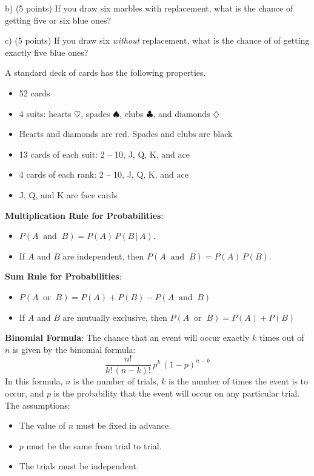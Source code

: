 \documentclass[10pt]{article}
\begin{document}
\hspace{10pt} b) (5 points) If you draw six marbles with replacement, what is the chance of getting 
 five or six blue ones?
\vspace{2.3in}

\hspace{10pt} c) (5 points) If you draw six  \textit{without} replacement, what is the chance of 
of getting  exactly five blue ones?

\vfill
\eject
 A standard deck of cards has the following properties.
\begin{itemize}
\item 52 cards
\item 4 suits:  hearts $\heartsuit$, spades $\spadesuit$, clubs $\clubsuit$,
  and diamonds $\diamondsuit$
\item Hearts and diamonds are red.  Spades and clubs are black
\item 13 cards of each suit:  2 -- 10, J, Q, K, and ace
\item 4 cards of each rank:  2 -- 10, J, Q, K, and ace
\item J, Q, and K are face cards
\end{itemize}

\textbf{Multiplication Rule for Probabilities}:  
\begin{itemize}
\item $P(A\;\;\mbox{and}\;\;B)=P(A)\,P(B\,\vert\,A)$.
\item If $A$ and $B$ are independent, then $P(A\;\;\mbox{and}\;\;B)=P(A)\,P(B)$.
\end{itemize}
\textbf{Sum Rule for Probabilities}:
\begin{itemize}
\item $P(A\;\;\mbox{or}\;\;B)=P(A)+P(B) - P(A\;\;\mbox{and}\;\;B)$
\item If $A$ and $B$ are mutually exclusive, then $P(A\;\;\mbox{or}\;\;B)=P(A)+P(B)$
\end{itemize}  
\bigskip


\textbf{Binomial Formula}:
The chance that an event will occur exactly $k$ times out of $n$ is given by 
the binomial formula:
\[\frac{n!}{k!\,(n-k)!}\,p^k\,(1-p)^{n-k}\]
In this formula, $n$ is the number of trials, $k$ is the number of times
the event is to occur, and $p$ is the probability that the event will occur
on any particular trial.    The assumptions:
\begin{itemize}
\item The value of $n$ must be fixed in advance.
\item $p$ must be the same from trial to trial.
\item The trials must be independent.
\end{itemize}
\end{document}

